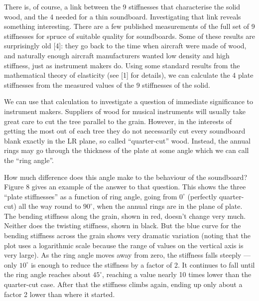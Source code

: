   There is, of course, a link between the 9 stiffnesses that characterise the 
  solid wood, and the 4 needed for a thin soundboard. Investigating that link 
  reveals something interesting. There are a few published measurements of the 
  full set of 9 stiffnesses for spruce of suitable quality for soundboards. 
  Some of these results are surprisingly old [4]: they go back to the time when 
  aircraft were made of wood, and naturally enough aircraft manufacturers 
  wanted low density and high stiffness, just as instrument makers do. Using 
  some standard results from the mathematical theory of elasticity (see [1] for 
  details), we can calculate the 4 plate stiffnesses from the measured values 
  of the 9 stiffnesses of the solid. 

  We can use that calculation to investigate a question of immediate 
  significance to instrument makers. Suppliers of wood for musical instruments 
  will usually take great care to cut the tree parallel to the grain. However, 
  in the interests of getting the most out of each tree they do not necessarily 
  cut every soundboard blank exactly in the LR plane, so called “quarter-cut” 
  wood. Instead, the annual rings may go through the thickness of the plate at 
  some angle which we can call the “ring angle”. 

  How much difference does this angle make to the behaviour of the soundboard? 
  Figure 8 gives an example of the answer to that question. This shows the 
  three “plate stiffnesses” as a function of ring angle, going from $0^\circ$ 
  (perfectly quarter-cut) all the way round to $90^\circ$, when the annual 
  rings are in the plane of plate. The bending stiffness along the grain, shown 
  in red, doesn’t change very much. Neither does the twisting stiffness, shown 
  in black. But the blue curve for the bending stiffness across the grain shows 
  very dramatic variation (noting that the plot uses a logarithmic scale 
  because the range of values on the vertical axis is very large). As the ring 
  angle moves away from zero, the stiffness falls steeply — only $10^\circ$ is 
  enough to reduce the stiffness by a factor of 2. It continues to fall until 
  the ring angle reaches about $45^\circ$, reaching a value nearly 10 times 
  lower than the quarter-cut case. After that the stiffness climbs again, 
  ending up only about a factor 2 lower than where it started. 



